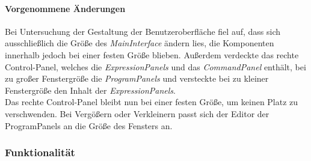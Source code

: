 \documentclass[parskip=full]{scrartcl}
\begin{document}
\paragraph{Vorgenommene Änderungen}
Bei Untersuchung der Gestaltung der Benutzeroberfläche  fiel auf, dass sich ausschließlich die Größe des \textit{MainInterface} ändern lies, die Komponenten innerhalb jedoch bei einer festen Größe blieben. Außerdem verdeckte das rechte Control-Panel, welches die \textit{ExpressionPanels} und das \textit{CommandPanel} enthält, bei zu großer Fenstergröße die \textit{ProgramPanels} und versteckte bei zu kleiner Fenstergröße den Inhalt der \textit{ExpressionPanels}.\\
Das rechte Control-Panel bleibt nun bei einer festen Größe, um keinen Platz zu verschwenden. Bei Vergößern oder Verkleinern passt sich der Editor der ProgramPanels an die Größe des Fensters an.
\subsubsection{Funktionalität}
\end{document}
